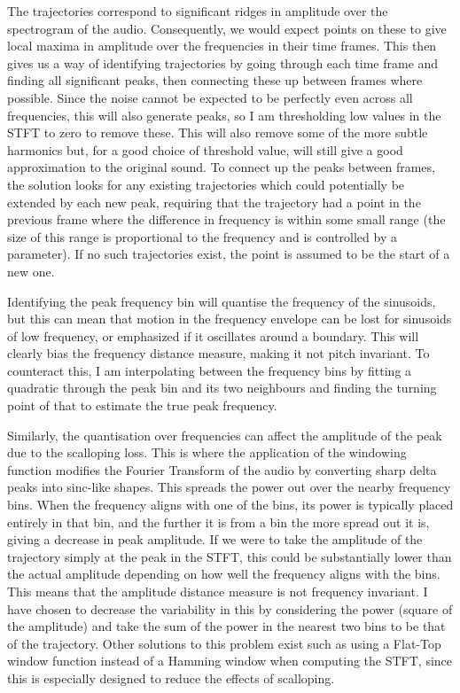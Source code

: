 \documentclass[10pt,twoside,a4paper]{report}
\begin{document}

The trajectories correspond to significant ridges in amplitude over the spectrogram of the audio. Consequently, we would expect points on these to give local maxima in amplitude over the frequencies in their time frames. This then gives us a way of identifying trajectories by going through each time frame and finding all significant peaks, then connecting these up between frames where possible. Since the noise cannot be expected to be perfectly even across all frequencies, this will also generate peaks, so I am thresholding low values in the STFT to zero to remove these. This will also remove some of the more subtle harmonics but, for a good choice of threshold value, will still give a good approximation to the original sound. To connect up the peaks between frames, the solution looks for any existing trajectories which could potentially be extended by each new peak, requiring that the trajectory had a point in the previous frame where the difference in frequency is within some small range (the size of this range is proportional to the frequency and is controlled by a parameter). If no such trajectories exist, the point is assumed to be the start of a new one.

Identifying the peak frequency bin will quantise the frequency of the sinusoids, but this can mean that motion in the frequency envelope can be lost for sinusoids of low frequency, or emphasized if it oscillates around a boundary. This will clearly bias the frequency distance measure, making it not pitch invariant. To counteract this, I am interpolating between the frequency bins by fitting a quadratic through the peak bin and its two neighbours and finding the turning point of that to estimate the true peak frequency.

Similarly, the quantisation over frequencies can affect the amplitude of the peak due to the scalloping loss. This is where the application of the windowing function modifies the Fourier Transform of the audio by converting sharp delta peaks into sinc-like shapes. This spreads the power out over the nearby frequency bins. When the frequency aligns with one of the bins, its power is typically placed entirely in that bin, and the further it is from a bin the more spread out it is, giving a decrease in peak amplitude. If we were to take the amplitude of the trajectory simply at the peak in the STFT, this could be substantially lower than the actual amplitude depending on how well the frequency aligns with the bins. This means that the amplitude distance measure is not frequency invariant. I have chosen to decrease the variability in this by considering the power (square of the amplitude) and take the sum of the power in the nearest two bins to be that of the trajectory. Other solutions to this problem exist such as using a Flat-Top window function instead of a Hamming window when computing the STFT, since this is especially designed to reduce the effects of scalloping.
\end{document}

